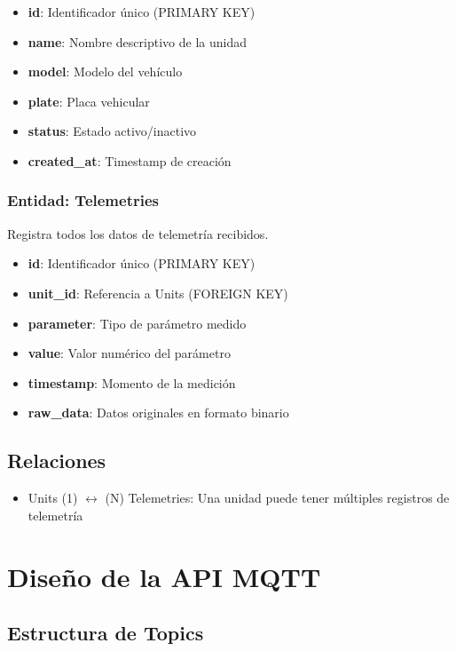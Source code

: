 \begin{itemize}[noitemsep]
    \item \textbf{id}: Identificador único (PRIMARY KEY)
    \item \textbf{name}: Nombre descriptivo de la unidad
    \item \textbf{model}: Modelo del vehículo
    \item \textbf{plate}: Placa vehicular
    \item \textbf{status}: Estado activo/inactivo
    \item \textbf{created\_at}: Timestamp de creación
\end{itemize}

\subsubsection{Entidad: Telemetries}
Registra todos los datos de telemetría recibidos.

\begin{itemize}[noitemsep]
    \item \textbf{id}: Identificador único (PRIMARY KEY)
    \item \textbf{unit\_id}: Referencia a Units (FOREIGN KEY)
    \item \textbf{parameter}: Tipo de parámetro medido
    \item \textbf{value}: Valor numérico del parámetro
    \item \textbf{timestamp}: Momento de la medición
    \item \textbf{raw\_data}: Datos originales en formato binario
\end{itemize}

\subsection{Relaciones}
\begin{itemize}[noitemsep]
    \item Units (1) $\leftrightarrow$ (N) Telemetries: Una unidad puede tener múltiples registros de telemetría
\end{itemize}

\section{Diseño de la API MQTT}

\subsection{Estructura de Topics}

